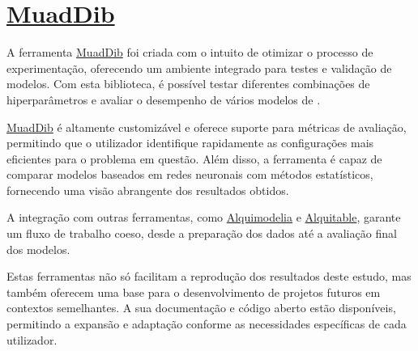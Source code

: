 \section{\href{https://github.com/alquimodelia/MuadDib}{MuadDib}\label{se:muaddib}}


A ferramenta \href{https://github.com/alquimodelia/MuadDib}{MuadDib} foi criada com o intuito de otimizar o processo de experimentação, oferecendo um ambiente integrado para testes e validação de modelos. Com esta biblioteca, é possível testar diferentes combinações de hiperparâmetros e avaliar o desempenho de vários modelos de . \par
\href{https://github.com/alquimodelia/MuadDib}{MuadDib} é altamente customizável e oferece suporte para métricas de avaliação, permitindo que o utilizador identifique rapidamente as configurações mais eficientes para o problema em questão. Além disso, a ferramenta é capaz de comparar modelos baseados em redes neuronais com métodos estatísticos, fornecendo uma visão abrangente dos resultados obtidos.\par
A integração com outras ferramentas, como \href{https://github.com/alquimodelia/alquimodelia}{Alquimodelia} e \href{https://github.com/alquimodelia/alquitable/blob/main/alquitable}{Alquitable}, garante um fluxo de trabalho coeso, desde a preparação dos dados até a avaliação final dos modelos. \par


\bigskip
Estas ferramentas não só facilitam a reprodução dos resultados deste estudo, mas também oferecem uma base para o desenvolvimento de projetos futuros em contextos semelhantes. A sua documentação e código aberto estão disponíveis, permitindo a expansão e adaptação conforme as necessidades específicas de cada utilizador. \par
